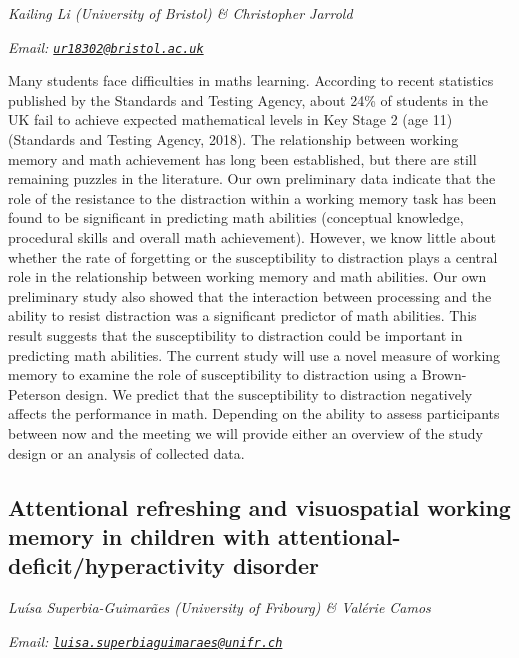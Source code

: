 \documentclass[
  12pt,
]{book}
\begin{document}
\emph{Kailing Li (University of Bristol) \& Christopher Jarrold}

\emph{Email: \href{mailto:ur18302@bristol.ac.uk}{\nolinkurl{ur18302@bristol.ac.uk}}}

Many students face difficulties in maths learning. According to recent statistics published by the Standards and Testing Agency, about 24\% of students in the UK fail to achieve expected mathematical levels in Key Stage 2 (age 11) (Standards and Testing Agency, 2018). The relationship between working memory and math achievement has long been established, but there are still remaining puzzles in the literature. Our own preliminary data indicate that the role of the resistance to the distraction within a working memory task has been found to be significant in predicting math abilities (conceptual knowledge, procedural skills and overall math achievement). However, we know little about whether the rate of forgetting or the susceptibility to distraction plays a central role in the relationship between working memory and math abilities. Our own preliminary study also showed that the interaction between processing and the ability to resist distraction was a significant predictor of math abilities. This result suggests that the susceptibility to distraction could be important in predicting math abilities. The current study will use a novel measure of working memory to examine the role of susceptibility to distraction using a Brown-Peterson design. We predict that the susceptibility to distraction negatively affects the performance in math. Depending on the ability to assess participants between now and the meeting we will provide either an overview of the study design or an analysis of collected data.

\hypertarget{attentional-refreshing-and-visuospatial-working-memory-in-children-with-attentional-deficithyperactivity-disorder}{%
\subsection{Attentional refreshing and visuospatial working memory in children with attentional-deficit/hyperactivity disorder}\label{attentional-refreshing-and-visuospatial-working-memory-in-children-with-attentional-deficithyperactivity-disorder}}

\emph{Luísa Superbia-Guimarães (University of Fribourg) \& Valérie Camos}

\emph{Email: \href{mailto:luisa.superbiaguimaraes@unifr.ch}{\nolinkurl{luisa.superbiaguimaraes@unifr.ch}}}
\end{document}
